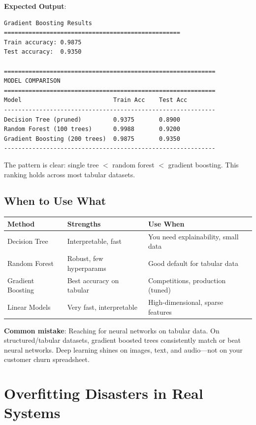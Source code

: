 \textbf{Expected Output}:
\begin{lstlisting}[style=outputstyle]
Gradient Boosting Results
==================================================
Train accuracy: 0.9875
Test accuracy:  0.9350

============================================================
MODEL COMPARISON
============================================================
Model                          Train Acc    Test Acc
------------------------------------------------------------
Decision Tree (pruned)         0.9375       0.8900
Random Forest (100 trees)      0.9988       0.9200
Gradient Boosting (200 trees)  0.9875       0.9350
------------------------------------------------------------
\end{lstlisting}

The pattern is clear: single tree $<$ random forest $<$ gradient boosting. This ranking holds across most tabular datasets.

\subsection{When to Use What}

\begin{table}[h]
\centering
\begin{tabular}{@{}lll@{}}
\toprule
\textbf{Method} & \textbf{Strengths} & \textbf{Use When} \\
\midrule
Decision Tree & Interpretable, fast & You need explainability, small data \\
Random Forest & Robust, few hyperparams & Good default for tabular data \\
Gradient Boosting & Best accuracy on tabular & Competitions, production (tuned) \\
Linear Models & Very fast, interpretable & High-dimensional, sparse features \\
\bottomrule
\end{tabular}
\end{table}

\begin{warningbox}
\textbf{Common mistake}: Reaching for neural networks on tabular data. On structured/tabular datasets, gradient boosted trees consistently match or beat neural networks. Deep learning shines on images, text, and audio---not on your customer churn spreadsheet.
\end{warningbox}

\section{Overfitting Disasters in Real Systems}

